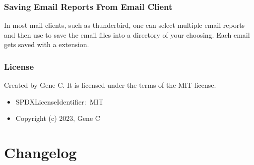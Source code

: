 \documentclass[letterpaper,10pt,english]{sphinxmanual}
\begin{document}
\subsection{Saving Email Reports From Email Client}
\label{\detokenize{Readme-TLS:saving-email-reports-from-email-client}}
\sphinxAtStartPar
In most mail clients, such as thunderbird,  one can select multiple email reports and
then use  to save the email files into a directory of your choosing.
Each email gets saved with a  extension.


\subsection{License}
\label{\detokenize{Readme-TLS:license}}
\sphinxAtStartPar
Created by Gene C. It is licensed under the terms of the MIT license.
\begin{itemize}
\item {} 
\sphinxAtStartPar
SPDX\sphinxhyphen{}License\sphinxhyphen{}Identifier: MIT

\item {} 
\sphinxAtStartPar
Copyright (c) 2023, Gene C

\end{itemize}

\sphinxstepscope


\chapter{Changelog}
\label{\detokenize{Changelog:changelog}}\label{\detokenize{Changelog::doc}}
\sphinxAtStartPar
{}

\begin{sphinxVerbatim}[commandchars=\\\{\}]
      
 
 
\end{sphinxVerbatim}

\sphinxAtStartPar
{}

\begin{sphinxVerbatim}[commandchars=\\\{\}]
         
 
\end{sphinxVerbatim}
\end{document}
